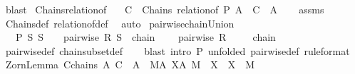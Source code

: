 \begin{isabellebody}
\ blast%
\endisatagproof
{\isafoldproof}%
%
\isadelimproof
\isanewline
%
\endisadelimproof
\isanewline
{}\isamarkupfalse%
\ Chains{\isacharunderscore}{\kern0pt}relation{\isacharunderscore}{\kern0pt}of{\isacharcolon}{\kern0pt}\isanewline
\ \ \ {\isachardoublequoteopen}C\ {\isasymin}\ Chains\ {\isacharparenleft}{\kern0pt}relation{\isacharunderscore}{\kern0pt}of\ P\ A{\isacharparenright}{\kern0pt}{\isachardoublequoteclose}\ \ {\isachardoublequoteopen}C\ {\isasymsubseteq}\ A{\isachardoublequoteclose}\isanewline
%
\isadelimproof
\ \ %
\endisadelimproof
%
\isatagproof
{}\isamarkupfalse%
\ assms\ \isamarkupfalse%
\ Chains{\isacharunderscore}{\kern0pt}def\ relation{\isacharunderscore}{\kern0pt}of{\isacharunderscore}{\kern0pt}def\ \isamarkupfalse%
\ auto%
\endisatagproof
{\isafoldproof}%
%
\isadelimproof
\isanewline
%
\endisadelimproof
\isanewline
{}\isamarkupfalse%
\ pairwise{\isacharunderscore}{\kern0pt}chain{\isacharunderscore}{\kern0pt}Union{\isacharcolon}{\kern0pt}\isanewline
\ \ \ P{\isacharcolon}{\kern0pt}\ {\isachardoublequoteopen}{\isasymAnd}S{\isachardot}{\kern0pt}\ S\ {\isasymin}\ {\isasymC}\ {\isasymLongrightarrow}\ pairwise\ R\ S{\isachardoublequoteclose}\ \ {\isachardoublequoteopen}chain\isactrlsub {\isasymsubseteq}\ {\isasymC}{\isachardoublequoteclose}\isanewline
\ \ \ {\isachardoublequoteopen}pairwise\ R\ {\isacharparenleft}{\kern0pt}{\isasymUnion}{\isasymC}{\isacharparenright}{\kern0pt}{\isachardoublequoteclose}\isanewline
%
\isadelimproof
\ \ %
\endisadelimproof
%
\isatagproof
{}\isamarkupfalse%
\ {\isacartoucheopen}chain\isactrlsub {\isasymsubseteq}\ {\isasymC}{\isacartoucheclose}\ \isamarkupfalse%
\ pairwise{\isacharunderscore}{\kern0pt}def\ chain{\isacharunderscore}{\kern0pt}subset{\isacharunderscore}{\kern0pt}def\isanewline
\ \ \isamarkupfalse%
\ {\isacharparenleft}{\kern0pt}blast\ intro{\isacharcolon}{\kern0pt}\ P\ {\isacharbrackleft}{\kern0pt}unfolded\ pairwise{\isacharunderscore}{\kern0pt}def{\isacharcomma}{\kern0pt}\ rule{\isacharunderscore}{\kern0pt}format{\isacharbrackright}{\kern0pt}{\isacharparenright}{\kern0pt}%
\endisatagproof
{\isafoldproof}%
%
\isadelimproof
\isanewline
%
\endisadelimproof
\isanewline
{}\isamarkupfalse%
\ Zorn{\isacharunderscore}{\kern0pt}Lemma{\isacharcolon}{\kern0pt}\ {\isachardoublequoteopen}{\isasymforall}C{\isasymin}chains\ A{\isachardot}{\kern0pt}\ {\isasymUnion}C\ {\isasymin}\ A\ {\isasymLongrightarrow}\ {\isasymexists}M{\isasymin}A{\isachardot}{\kern0pt}\ {\isasymforall}X{\isasymin}A{\isachardot}{\kern0pt}\ M\ {\isasymsubseteq}\ X\ {\isasymlongrightarrow}\ X\ {\isacharequal}{\kern0pt}\ M{\isachardoublequoteclose}\isanewline

\end{isabellebody}
